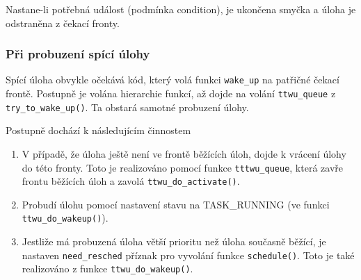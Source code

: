 \documentclass[
  master=true,
  font=sans,
  printversion=false,
  joinlists=true,
  figures=true,
  tables=true,
  sourcecodes=false,
  theorems=false,
  bibencoding=utf8,
  language=czech,
  encoding=utf8,
  field=ainfk,
  biblatex,
  glossaries,
  index
]{kidiplom}
\begin{document}
Nastane-li potřebná událost (podmínka condition), je ukončena smyčka a úloha je odstraněna z čekací fronty. 

\subsubsection{Při probuzení spící úlohy}


Spící úloha obvykle očekává kód, který volá funkci \verb#wake_up# na patřičné čekací frontě. Postupně je volána hierarchie funkcí, až dojde na volání \verb#ttwu_queue# z \verb#try_to_wake_up()#. Ta obstará samotné probuzení úlohy.  

Postupně dochází k následujícím činnostem
\begin{enumerate}
\item V případě, že úloha ještě není ve frontě běžících úloh, dojde k vrácení úlohy do této fronty. Toto je realizováno pomocí funkce \verb#tttwu_queue#, která zavře frontu běžících úloh a zavolá \verb#ttwu_do_activate()#.
\item Probudí úlohu pomocí nastavení stavu na TASK\_RUNNING (ve funkci \newline \verb#ttwu_do_wakeup()#).
\item Jestliže má probuzená úloha větší prioritu než úloha současně běžící, je nastaven \verb#need_resched# příznak pro vyvolání funkce \verb#schedule()#. Toto je také realizováno z funkce \verb#ttwu_do_wakeup()#.
\end{enumerate}
\end{document}
